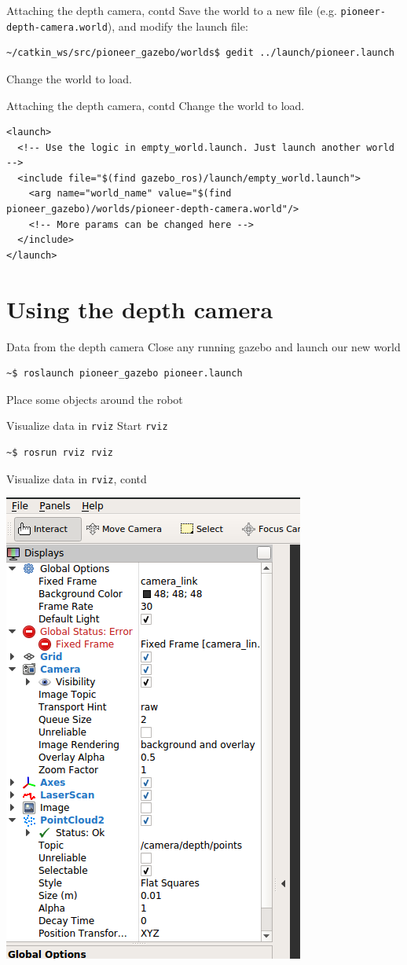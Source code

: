 \documentclass[presentation,aspectratio=1610]{beamer}
\begin{document}
\begin{frame}[fragile,label=sec-3-7]{Attaching the depth camera, contd}
 Save the world to a new file (e.g. \texttt{pioneer-depth-camera.world}), and modify the launch file:
\begin{verbatim}
~/catkin_ws/src/pioneer_gazebo/worlds$ gedit ../launch/pioneer.launch
\end{verbatim}
Change the world to load.
\end{frame}

\begin{frame}[fragile,label=sec-3-8]{Attaching the depth camera, contd}
 Change the world to load.

\begin{verbatim}
<launch>
  <!-- Use the logic in empty_world.launch. Just launch another world -->
  <include file="$(find gazebo_ros)/launch/empty_world.launch">
    <arg name="world_name" value="$(find pioneer_gazebo)/worlds/pioneer-depth-camera.world"/>
    <!-- More params can be changed here -->
  </include>
</launch>
\end{verbatim}
\end{frame}

\section{Using the depth camera}
\label{sec-4}
\begin{frame}[fragile,label=sec-4-1]{Data from the depth camera}
 Close any running gazebo and launch our new world
\begin{verbatim}
~$ roslaunch pioneer_gazebo pioneer.launch
\end{verbatim}

Place some objects around the robot
\end{frame}
\begin{frame}[fragile,label=sec-4-2]{Visualize data in \texttt{rviz}}
 Start \texttt{rviz}
\begin{verbatim}
~$ rosrun rviz rviz
\end{verbatim}
\end{frame}

\begin{frame}[fragile,label=sec-4-3]{Visualize data in \texttt{rviz}, contd}
 \begin{center}
\includegraphics[width=0.3\linewidth]{rviz.png}
\end{center}
\end{frame}
\end{document}
